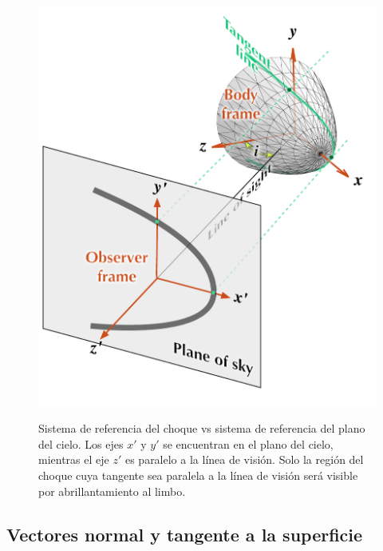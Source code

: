 \begin{figure}
  \includegraphics[width=0.5\linewidth]{./Figures/projection-pos}
  \label{fig:reference}
  \caption{Sistema de referencia del choque vs sistema de referencia del plano del cielo. Los ejes $x'$ y $y'$ se encuentran en el plano del cielo, mientras el eje $z'$ es paralelo a la línea de visión. Solo la región del choque cuya tangente sea paralela a la línea de visión será visible por abrillantamiento al limbo.}
\end{figure}

\subsection{Vectores normal y tangente a la superficie}

